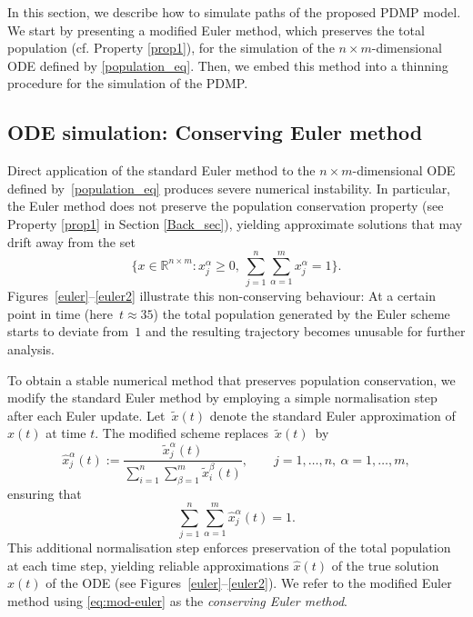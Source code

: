 \documentclass[11pt]{article}
\theoremstyle{plain}
\theoremstyle{definition}
\newcommand{\1}{\mathbf{1}}
\begin{document}
In this section, we describe how to simulate paths of the proposed PDMP model. We start by presenting a modified Euler method, which preserves the total population (cf. Property \ref{prop1}), for the simulation of the $n\times m$-dimensional ODE defined by \eqref{population_eq}. Then, we embed this method into a thinning procedure for the simulation of the PDMP.

\subsection{ODE simulation: Conserving Euler method}
\label{Im_Eul}

Direct application of the standard Euler method \cite{euler_citation} to the $n\times m$-dimensional ODE defined by~\eqref{population_eq} produces severe numerical instability. In particular, the Euler method does not preserve the population conservation property (see Property \ref{prop1} in Section \ref{Back_sec}), yielding approximate solutions that may drift away from the set
\begin{equation*}
    \Big\{x \in \mathbb{R}^{n \times m} \colon x_j^\alpha \geq 0, \ \sum_{j=1}^n\sum_{\alpha=1}^m x_j^\alpha = 1\Big\}.
\end{equation*}
Figures~\ref{euler}--\ref{euler2} illustrate this non-conserving behaviour: At a certain point in time (here~\mbox{$t \approx 35$}) the total population
generated by the Euler scheme starts to deviate from~$1$ and the resulting trajectory becomes unusable for further analysis.

To obtain a stable numerical method that preserves population conservation, we modify the standard Euler method by employing a  
simple normalisation step after each Euler update. Let~$\tilde{x}(t)$ denote the standard Euler approximation of $x(t)$ at time $t$. The modified scheme replaces~$\tilde{x}(t)$~by 
\begin{equation}\label{eq:mod-euler}
\hat{x}_j^\alpha(t)
    := \frac{\tilde{x}_j^\alpha(t)}
            {\displaystyle\sum_{i=1}^n\sum_{\beta=1}^m \tilde{x}_i^\beta(t)} , \qquad j=1,\ldots,n, \ \alpha=1,\ldots,m,
\end{equation}
ensuring that
\[
\sum_{j=1}^n\sum_{\alpha=1}^m \hat{x}_j^\alpha(t) = 1.
\]
This additional normalisation step enforces preservation of the total population at each time step, yielding reliable approximations $\hat{x}(t)$ of the true solution $x(t)$ of the ODE (see \mbox{Figures~\ref{euler}--\ref{euler2}}).  
We refer to the modified Euler method using \eqref{eq:mod-euler} as the \textit{conserving Euler method}.
\end{document}
